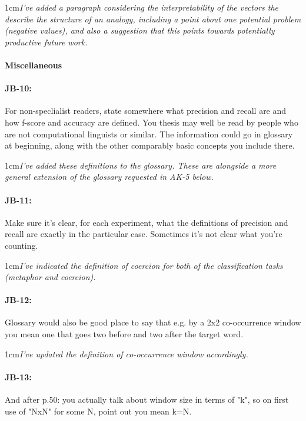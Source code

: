 \documentclass[11pt,a4paper]{article}
\newcommand{\res}[1]{\vspace{0.25cm} \begin{adjustwidth}{1cm}{}\emph{#1}\end{adjustwidth}}
\begin{document}
\res{I've added a paragraph considering the interpretability of the vectors the describe the structure of an analogy, including a point about one potential problem (negative values), and also a suggestion that this points towards potentially productive future work.}


\paragraph{Miscellaneous}

\paragraph{JB-10:} For non-speclialist readers, state somewhere what precision and recall are and how f-score and accuracy are defined. You thesis may well be read by people who are not computational linguists or similar. The information could go in glossary at beginning, along with the other comparably basic concepts you include there.

\res{I've added these definitions to the glossary.  These are alongside a more general extension of the glossary requested in AK-5 below.}

\paragraph{JB-11:} Make sure it's clear, for each experiment, what the definitions of precision and recall are exactly in the particular case. Sometimes it's not clear what you're counting.

\res{I've indicated the definition of coercion for both of the classification tasks (metaphor and coercion).}

\paragraph{JB-12:} Glossary would also be good place to say that e.g. by a 2x2 co-occurrence window you mean one that goes two before and two after the target word.

\res{I've updated the definition of co-occurrence window accordingly.}

\paragraph{JB-13:} And after p.50: you actually talk about window size in terms of "k", so on first use of "NxN" for some N, point out you mean k=N.
\end{document}
